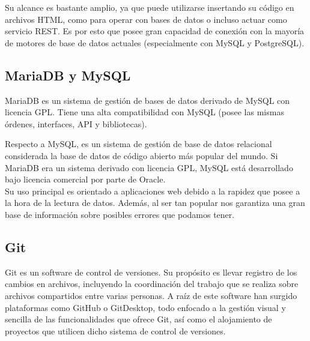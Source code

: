 Su alcance es bastante amplio, ya que puede utilizarse insertando su código en archivos HTML, como para operar con bases de datos o incluso actuar como servicio REST. Es por esto que posee gran capacidad de conexión con la mayoría de motores de base de datos actuales (especialmente con MySQL y PostgreSQL).\\

\clearpage

\subsection{MariaDB y MySQL}


MariaDB es un sistema de gestión de bases de datos derivado de MySQL con licencia GPL. Tiene una alta compatibilidad con MySQL (posee las mismas órdenes, interfaces, API y bibliotecas).\\


Respecto a MySQL, es un sistema de gestión de base de datos relacional considerada la base de datos de código abierto más popular del mundo. Si MariaDB era un sistema derivado con licencia GPL, MySQL está desarrollado bajo licencia comercial por parte de Oracle.\\

Su uso principal es orientado a aplicaciones web debido a la rapidez que posee a la hora de la lectura de datos. Además, al ser tan popular nos garantiza una gran base de información sobre posibles errores que podamos tener.\\

\clearpage

\subsection{Git}


Git es un software de control de versiones. Su propósito es llevar registro de los cambios en archivos, incluyendo la coordinación del trabajo que se realiza sobre archivos compartidos entre varias personas. A raíz de este software han surgido plataformas como GitHub o GitDesktop, todo enfocado a la gestión visual y sencilla de las funcionalidades que ofrece Git, así como el alojamiento de proyectos que utilicen dicho sistema de control de versiones.\\

